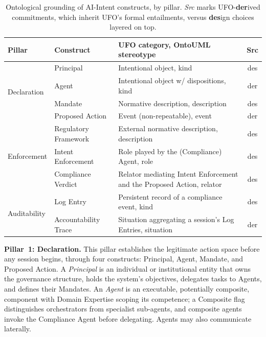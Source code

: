 \documentclass[runningheads]{llncs}
\begin{document}
\begin{table}
\color{black}
\centering
\caption{Ontological grounding of AI-Intent constructs, by pillar. \emph{Src} marks UFO-\textbf{der}ived commitments, which inherit UFO's formal entailments, versus \textbf{des}ign choices layered on top.}
\label{tab:ufo}
\newcommand{\uml}[1]{\guillemotleft #1\guillemotright}
\begin{tabularx}{\textwidth}{@{}llXc@{}}
\toprule
\textbf{Pillar} & \textbf{Construct} & \textbf{UFO category, OntoUML stereotype} & \textbf{Src}\\
\midrule
\multirow[t]{4}{*}{Declaration}
  & Principal            & Intentional object, \uml{kind}                                & des \\
  & Agent                & Intentional object w/ dispositions, \uml{kind}                & der \\
  & Mandate              & Normative description, \uml{description} & des \\
  & Proposed Action      & Event (non-repeatable), \uml{event}                           & der \\
\midrule
\multirow[t]{3}{*}{Enforcement}
  & Regulatory Framework & External normative description, \uml{description}                & des \\
  & Intent Enforcement   & Role played by the (Compliance) Agent, \uml{role}        & des \\
  & Compliance Verdict   & Relator mediating Intent Enforcement and the Proposed Action, \uml{relator}  & des \\
\midrule
\multirow[t]{2}{*}{Auditability}
  & Log Entry            & Persistent record of a compliance event, \uml{kind}           & des \\
  & Accountability Trace & Situation aggregating a session's Log Entries, \uml{situation}& der \\
\bottomrule
\end{tabularx}
\end{table}

\textbf{Pillar~1: Declaration.}
This pillar establishes the legitimate action space before any session begins, through four constructs: Principal, Agent, Mandate, and Proposed Action. A \textit{Principal} is an individual or institutional entity that owns the governance structure, holds the system's objectives, delegates tasks to Agents, and defines their Mandates. An \textit{Agent} is an executable, potentially composite, component with Domain Expertise scoping its competence; a Composite flag distinguishes orchestrators from specialist sub-agents, and composite agents invoke the Compliance Agent before delegating. Agents may also communicate laterally.
\end{document}

